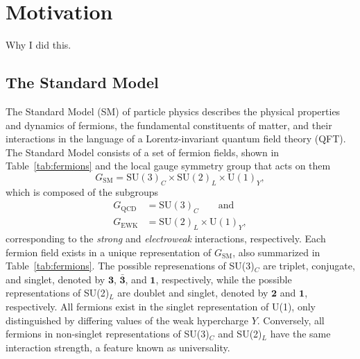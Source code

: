 \chapter{Motivation}

Why I did this.

\section{The Standard Model}
\label{sec:sm}

The Standard Model (SM) of particle physics describes the physical properties and dynamics of fermions, the fundamental constituents of matter, and their interactions in the language of a Lorentz-invariant quantum field theory (QFT).
The Standard Model consists of a set of fermion fields, shown in Table~\ref{tab:fermions} and the local gauge symmetry group that acts on them
\begin{equation}
  G_{\text{SM}} = \text{SU}(3)_C \times \text{SU}(2)_L \times \text{U}(1)_Y,
\end{equation}
which is composed of the subgroups
\begin{align}
  G_{\text{QCD}} & = \text{SU}(3)_C \qquad \text{and} \\
  G_{\text{EWK}} & = \text{SU}(2)_L \times \text{U}(1)_Y,
\end{align}
corresponding to the \textit{strong} and \textit{electroweak} interactions, respectively.
Each fermion field exists in a unique representation of $G_{\text{SM}}$, also summarized in Table~\ref{tab:fermions}.
The possible represenations of SU(3)$_C$ are triplet, conjugate, and singlet, denoted by $\mathbf{3}$, $\mathbf{\bar{3}}$, and $\mathbf{1}$, respectively, while the possible representations of SU(2)$_L$ are doublet and singlet, denoted by $\mathbf{2}$ and $\mathbf{1}$, respectively.
All fermions exist in the singlet representation of U(1), only distinguished by differing values of the weak hypercharge $Y$.
Conversely, all fermions in non-singlet representations of SU(3)$_C$ and SU(2)$_L$ have the same interaction strength, a feature known as universality.

